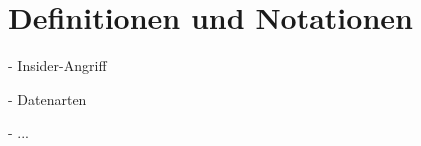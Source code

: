 \section{Definitionen und Notationen}

\label{sec_basics_definitions}

- Insider-Angriff

- Datenarten

- ...